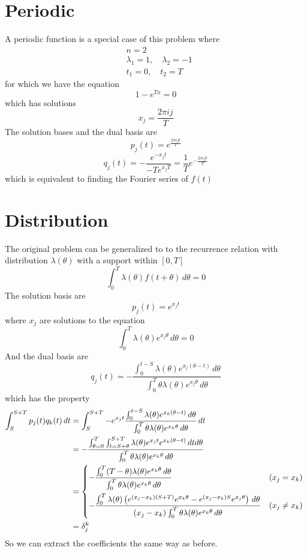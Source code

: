 \documentclass[]{article}
\begin{document}
\section{Periodic}
A periodic function is a special case of this problem where
\begin{align*}
	&n = 2 \\
	&\lambda_1 = 1,\quad\lambda_2 = -1\\
	&t_1 = 0,\quad t_2 = T
\end{align*}
for which we have the equation
\[
1 - e^{Tx} = 0
\]
which has solutions
\[
x_j = \frac{2\pi i j}{T}
\]
The solution bases and the dual basis are
\[
p_j(t) = e^{\frac{2\pi i jt}{T}}
\]
\[
q_j(t) =  -\frac{ e^{-x_jt} }{ -T e^{x_j T}} = \frac{1}{T}e^{-\frac{2\pi i jt}{T}}
\]
which is equivalent to finding the Fourier series of $f(t)$

\section{Distribution}
The original problem can be generalized to to the recurrence relation with distribution $\lambda(\theta)$ with a support within $[0, T]$
\[
\int_{0}^{T}\lambda(\theta)f(t + \theta)\, d\theta = 0
\]
The solution basis are
\[
p_j(t) = e^{x_jt}
\]
where $x_j$ are solutions to the equation
\[
\int_{0}^{T}\lambda(\theta)e^{x_j\theta}\,d\theta = 0
\]
And the dual basis are
\[
q_j(t) = -\frac{\int_0^{t-S} \lambda(\theta)e^{x_j(\theta-t)}\,d\theta}{\int_0^T\theta\lambda(\theta)e^{x_j\theta}\,d\theta}
\]
which has the property
\begin{align*}
	\int_S^{S+T} p_j(t)q_k(t)\,dt &= \int_S^{S+T} -e^{x_jt}\frac{\int_0^{t-S} \lambda(\theta)e^{x_k(\theta-t)}\,d\theta}{\int_0^T\theta\lambda(\theta)e^{x_k\theta}\,d\theta}\,dt \\
	&= -\frac{\int_{\theta=0}^{T}\int_{t=S+\theta}^{S+T} \lambda(\theta)e^{x_jt}e^{x_k(\theta-t)}\, dt d\theta}{\int_0^T\theta\lambda(\theta)e^{x_k\theta}\,d\theta } \\
	&=\begin{dcases*}
		-\frac{\int_{0}^{T} (T-\theta)\lambda(\theta)e^{x_k\theta}\,d\theta}{\int_0^T\theta\lambda(\theta)e^{x_k\theta}\,d\theta } & $(x_j = x_k)$\\
		-\frac{\int_{0}^{T}\lambda(\theta)\left(e^{(x_j-x_k)(S+T)}e^{x_k\theta} - e^{(x_j-x_k)S}e^{x_j\theta}\right)\,d\theta }{(x_j-x_k)\int_0^T\theta\lambda(\theta)e^{x_k\theta}\,d\theta }  & $(x_j \ne x_k)$
	\end{dcases*}\\
	&=\delta_j^k
\end{align*}
So we can extract the coefficients the same way as before.
\end{document}
